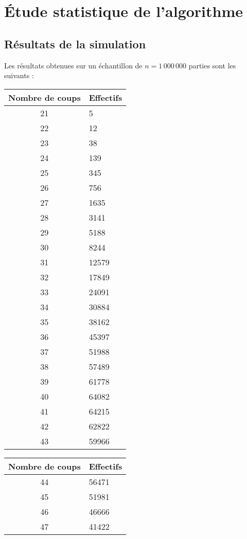 \chapter{Étude statistique de l'algorithme}\label{annexe_stats}

\section{Résultats de la simulation}
Les résultats obtenues sur un échantillon de $n=1\,000\,000$ parties sont les suivants :
\begin{center}
\begin{tabular}[t]{|c|l|}
\hline
Nombre de coups & Effectifs\\
\hline
21 & 5\\
\hline
22 & 12\\
\hline
23 & 38\\
\hline
24 & 139\\
\hline
25 & 345\\
\hline
26 & 756\\
\hline
27 & 1635\\
\hline
28 & 3141\\
\hline
29 & 5188\\
\hline
30 & 8244\\
\hline
31 & 12579\\
\hline
32 & 17849\\
\hline
33 & 24091\\
\hline
34 & 30884\\
\hline
35 & 38162\\
\hline
36 & 45397\\
\hline
37 & 51988\\
\hline
38 & 57489\\
\hline
39 & 61778\\
\hline
40 & 64082\\
\hline
41 & 64215\\
\hline
42 & 62822\\
\hline
43 & 59966\\
\hline
\end{tabular}\hspace{0.5cm}
\begin{tabular}[t]{|c|l|}
\hline
Nombre de coups & Effectifs\\
\hline
44 & 56471\\
\hline
45 & 51981\\
\hline
46 & 46666\\
\hline
47 & 41422\\

\end{tabular}
\end{center}
